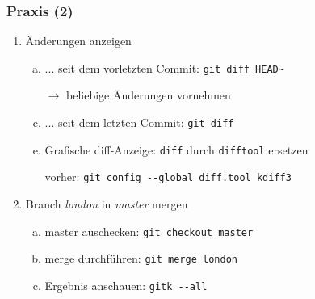 \documentclass{beamer}
\begin{document}
\begin{frame}[fragile,label=uebung20]
\frametitle{Praxis (2)}
\begin{enumerate}
 \setcounter{enumi}{\value{taskcounter}}

 \item Änderungen anzeigen
 \begin{enumerate}[a)]
  \item ... seit dem vorletzten Commit: \verb|git diff HEAD~|
  \item[$\rightarrow$] beliebige Änderungen vornehmen
  \item ... seit dem letzten Commit: \verb|git diff|
  \item[]
  \item Grafische diff-Anzeige: \verb|diff| durch \verb|difftool| ersetzen
  \item[] vorher: \verb|git config --global diff.tool kdiff3|
  \end{enumerate}
  \item Branch \textit{london} in \textit{master} mergen
  \begin{enumerate}[a)]
   \item master auschecken: \verb|git checkout master|
   \item merge durchführen: \verb|git merge london|
   \item Ergebnis anschauen: \verb|gitk --all|
  \end{enumerate}

 \setcounter{taskcounter}{\value{enumi}}
\end{enumerate}



\end{frame}


\end{document}
